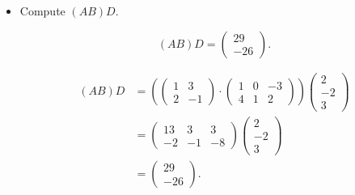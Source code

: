\begin{Exercise}
\begin{itemize}
\item Compute $(A B)D$.
\begin{answer}
$$
(AB)D = \begin{pmatrix}
29 \\
-26
\end{pmatrix}.
$$
\end{answer}
\begin{solution}
\begin{align*}
(AB)D
&= \left( \begin{pmatrix}
1 & 3 \\
2 & -1
\end{pmatrix} \cdot \begin{pmatrix}
1 & 0 & -3 \\
4 & 1 & 2
\end{pmatrix} \right) \begin{pmatrix}
2 \\
-2 \\
3
\end{pmatrix} \\
&= \begin{pmatrix}
13 & 3 & 3 \\
-2 & -1 & -8
\end{pmatrix} \begin{pmatrix}
2 \\
-2 \\
3
\end{pmatrix} \\
&= \begin{pmatrix}
29 \\
-26
\end{pmatrix}.
\end{align*}
\end{solution}


\end{itemize}
\end{Exercise}
